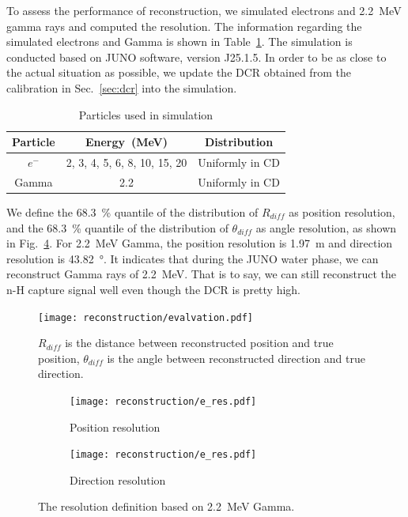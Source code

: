To assess the performance of reconstruction, we simulated electrons and \SI{2.2}{MeV} gamma rays and computed the resolution. The information regarding the simulated electrons and Gamma is shown in Table~\ref{tab:particles}. The simulation is conducted based on JUNO software, version J25.1.5. In order to be as close to the actual situation as possible, we update the DCR obtained from the calibration in Sec.~\ref{sec:dcr} into the simulation.
\begin{table}[ht]
	\centering
	\caption{Particles used in simulation}
	\label{tab:particles}
	\begin{tabular}{ccc}
		\toprule
		Particle & Energy~(MeV)                 & Distribution    \\
		\midrule
		$e^-$    & 2, 3, 4, 5, 6, 8, 10, 15, 20 & Uniformly in CD \\
		Gamma    & 2.2                          & Uniformly in CD \\
		\bottomrule
	\end{tabular}
\end{table}

We define the \SI{68.3}{\%} quantile of the distribution of $R_{diff}$ as position resolution, and
the \SI{68.3}{\%} quantile of the distribution of $\theta_{diff}$ as angle resolution, as shown in Fig.~\ref{fig:dir_cal}. For \SI{2.2}{MeV} Gamma, the position resolution is \SI{1.97}{m} and direction resolution is \SI{43.82}{\degree}. It indicates that during the JUNO water phase, we can reconstruct Gamma rays of \SI{2.2}{MeV}. That is to say, we can still reconstruct the n-H capture signal well even though the DCR is pretty high.
\begin{figure}[htbp]
	\centering
	\texttt{[image: reconstruction/evalvation.pdf]}
	\caption{$R_{diff}$ is the distance between reconstructed position and true position, $\theta_{diff}$ is the angle between reconstructed direction and true direction.}
	\label{fig:evalvation}
\end{figure}

\begin{figure}[htbp]
	\centering
	\begin{subfigure}{0.5\textwidth} %
		\centering
		\texttt{[image: reconstruction/e\_res.pdf]}
		\caption{Position resolution}
		\label{fig:gamma_pos}
	\end{subfigure}%
	\hfill
	\begin{subfigure}{0.5\textwidth}
		\centering
		\texttt{[image: reconstruction/e\_res.pdf]}
		\caption{Direction resolution}
		\label{fig:gamma_dir}
	\end{subfigure}%
	\caption{The resolution definition based on \SI{2.2}{MeV} Gamma.}
	\label{fig:dir_cal}
\end{figure}

